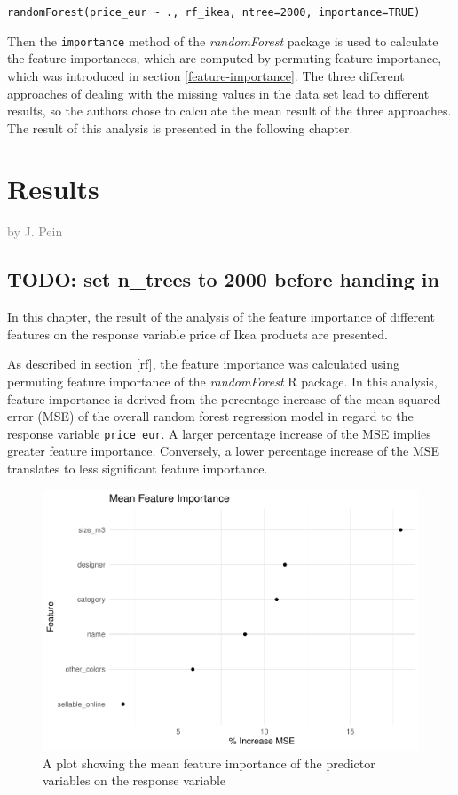 \documentclass[a4paper, nobind]{templates/ociamthesis}
\begin{document}
\texttt{randomForest(price\_eur\ \textasciitilde{}\ .,\ rf\_ikea,\ ntree=2000,\ importance=TRUE)}

Then the \texttt{importance} method of the \emph{randomForest} package is used to calculate the feature importances, which are computed by permuting feature importance, which was introduced in section \ref{feature-importance}. The three different approaches of dealing with the missing values in the data set lead to different results, so the authors chose to calculate the mean result of the three approaches. The result of this analysis is presented in the following chapter.

\hypertarget{results}{%
\chapter{Results}\label{results}}

\hfill\textcolor{gray}{by J. Pein}

\hypertarget{todo-set-n_trees-to-2000-before-handing-in}{%
\section{TODO: set n\_trees to 2000 before handing in}\label{todo-set-n_trees-to-2000-before-handing-in}}

In this chapter, the result of the analysis of the feature importance of different features on the response variable price of Ikea products are presented.

As described in section \ref{rf}, the feature importance was calculated using permuting feature importance of the \emph{randomForest} R package. In this analysis, feature importance is derived from the percentage increase of the mean squared error (MSE) of the overall random forest regression model in regard to the response variable \texttt{price\_eur}. A larger percentage increase of the MSE implies greater feature importance. Conversely, a lower percentage increase of the MSE translates to less significant feature importance.

\begin{figure}
\includegraphics[width=1\linewidth]{_main_files/figure-latex/mean-feature-importance-1} \caption{A plot showing the mean feature importance of the predictor variables on the response variable}\label{fig:mean-feature-importance}
\end{figure}
\end{document}

